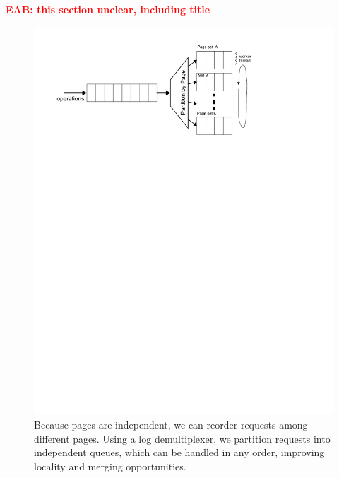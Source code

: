 \documentclass[letterpaper,twocolumn,10pt]{article}
\newcommand{\eab}[1]{\textcolor{red}{\bf EAB: #1}}
\begin{document}
\eab{this section unclear, including title}

\label{sec:logging}
\begin{figure}
\includegraphics[width=1\columnwidth]{figs/graph-traversal.pdf}
\vspace{-24pt}
\caption{\sf\label{fig:multiplexor} Because pages are independent, we
can reorder requests among different pages. Using a log demultiplexer,
we partition requests into independent queues, which can be 
handled in any order, improving locality and merging opportunities.}
\end{figure}
\end{document}
